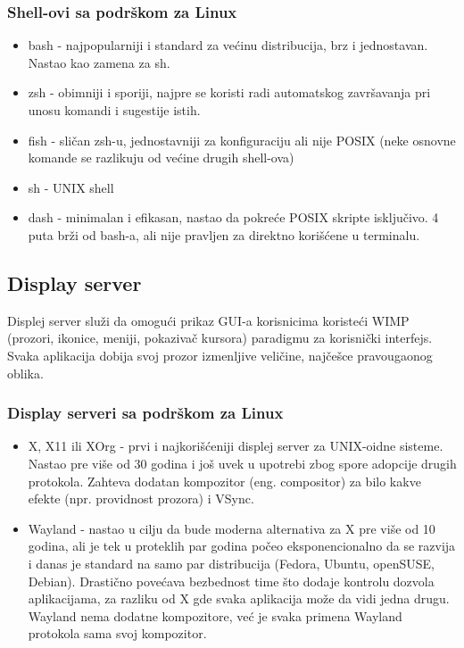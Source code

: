\documentclass[a4paper,14pt]{article}
\begin{document}
\subsubsection{Shell-ovi sa podrškom za Linux}
\begin{itemize}
\item bash - najpopularniji i standard za većinu distribucija, brz i jednostavan. Nastao kao zamena za sh.
\item zsh - obimniji i sporiji, najpre se koristi radi automatskog završavanja pri unosu komandi i sugestije istih.
\item fish - sličan zsh-u, jednostavniji za konfiguraciju ali nije POSIX (neke osnovne komande se razlikuju od većine drugih shell-ova)
\item sh - UNIX shell
\item dash - minimalan i efikasan, nastao da pokreće POSIX skripte isključivo. 4 puta brži od bash-a, ali nije pravljen za direktno korišćene u terminalu.
\end{itemize}

\subsection{Display server}
Displej server služi da omogući prikaz GUI-a korisnicima koristeći WIMP (prozori, ikonice, meniji, pokazivač kursora) paradigmu za korisnički interfejs. Svaka aplikacija dobija svoj prozor izmenljive veličine, najčešce pravougaonog oblika.
\subsubsection{Display serveri sa podrškom za Linux}
\begin{itemize}
\item X, X11 ili XOrg - prvi i najkorišćeniji displej server za UNIX-oidne sisteme. Nastao pre više od 30 godina i još uvek u upotrebi zbog spore adopcije drugih protokola. Zahteva dodatan kompozitor (eng. compositor) za bilo kakve efekte (npr. providnost prozora) i VSync.
\item Wayland - nastao u cilju da bude moderna alternativa za X pre više od 10 godina, ali je tek u proteklih par godina počeo eksponencionalno da se razvija i danas je standard na samo par distribucija (Fedora, Ubuntu, openSUSE, Debian). Drastično povećava bezbednost time što dodaje kontrolu dozvola aplikacijama, za razliku od X gde svaka aplikacija može da vidi jedna drugu. Wayland nema dodatne kompozitore, već je svaka primena Wayland protokola sama svoj kompozitor.
\end{itemize}
\newpage
\end{document}
